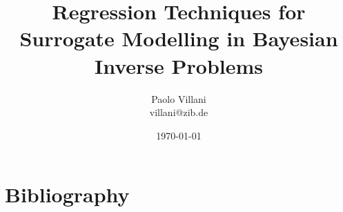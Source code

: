 \documentclass[10pt, a4paper, twoside]{article}
\begin{document}
\title{Regression Techniques for Surrogate Modelling in Bayesian Inverse Problems}
\author{Paolo Villani\\villani@zib.de}
\date{\today}

\pagestyle{fancy}
\pagestyle{fancyfront}


\newpage
{}


\pagestyle{fancymain}
\newpage
\tableofcontents
\newpage
{}

\newpage

\newpage

\newpage

\newpage

\newpage

\newpage



\newpage
\pagestyle{fancybib}
\section*{Bibliography}

\renewcommand\refname{}



\newpage
\pagestyle{fancyapp}
\appendix


\end{document}
